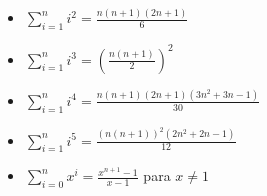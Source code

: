\begin{itemize}
\item	$\sum_{i=1}^{n} i^2 = \frac{n(n+1)(2n+1)}{6}$
\item	$\sum_{i=1}^{n} i^3 = (\frac{n(n+1)}{2})^2$
\item	$\sum_{i=1}^{n} i^4 = \frac{n(n+1)(2n+1)(3n^2+3n-1)}{30}$
\item	$\sum_{i=1}^{n} i^5 = \frac{(n(n+1))^2(2n^2+2n-1)}{12}$
\item	$\sum_{i=0}^{n} x^i = \frac{x^{n+1}-1}{x-1}$ para $x \neq 1$	
\end{itemize}